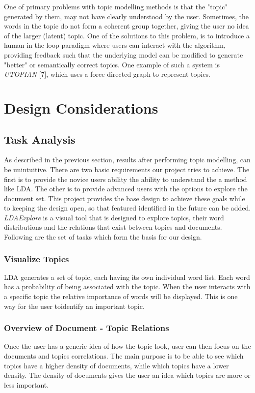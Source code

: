\documentclass[10pt,journal,compsoc]{IEEEtran}
\begin{document}
One of primary problems with topic modelling methods is that the "topic" generated by them, may not have clearly understood by the user. Sometimes, the words in the topic do not form a coherent group together, giving the user no idea of the larger (latent) topic. One of the solutions to this problem, is to introduce a human-in-the-loop paradigm where users can interact with the algorithm, providing feedback such that the underlying model can be modified to generate "better" or semantically correct topics. One example of such a system is \textit{UTOPIAN} [7], which uses a force-directed graph to represent topics.

\section{Design Considerations}
\label{sec:design}

\subsection{Task Analysis}
As described in the previous section, results after performing topic modelling, can be unintuitive. There are two basic requirements our project tries to achieve. The first is to provide the novice users ability the ability to understand the a method like LDA. The other is to provide advanced users with the options to explore the document set. This project provides the base design to achieve these goals while to keeping the design open, so that featured identified in the future can be added. \textit{LDAExplore} is a visual tool that is designed to explore topics, their word distributions and the relations that exist between topics and documents. Following are the set of tasks which form the basis for our design.

\subsubsection{Visualize Topics}
LDA generates a set of topic, each having its own individual word list. Each word has a probability of being associated with the topic. When the user interacts with a specific topic the relative importance of words will be displayed. This is one way for the user toidentify an important topic.

\subsubsection{Overview of Document - Topic Relations}
Once the user has a generic idea of how the topic look, user can then focus on the documents and topics correlations. The main purpose is to be able to see which topics have a higher density of documents, while which topics have a lower density. The density of documents gives the user an idea which topics are more or less important.
\end{document}
